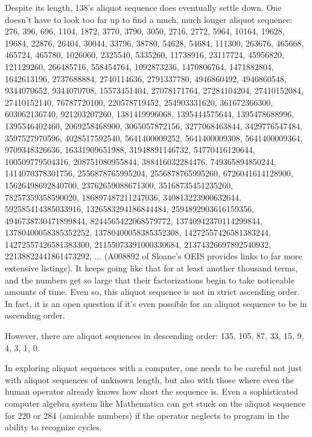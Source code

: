 \documentclass[12pt]{article}
\begin{document}
Despite its length, 138's aliquot sequence does eventually settle down. One doesn't have to look too far up to find a much, much longer aliquot sequence: 276, 396, 696, 1104, 1872, 3770, 3790, 3050, 2716, 2772, 5964, 10164, 19628, 19684, 22876, 26404, 30044, 33796, 38780, 54628, 54684, 111300, 263676, 465668, 465724, 465780, 1026060, 2325540, 5335260, 11738916, 23117724, 45956820, 121129260, 266485716, 558454764, 1092873236, 1470806764, 1471882804, 1642613196, 2737688884, 2740114636, 2791337780, 4946860492, 4946860548, 9344070652, 9344070708, 15573451404, 27078171764, 27284104204, 27410152084, 27410152140, 76787720100, 220578719452, 254903331620, 361672366300, 603062136740, 921203207260, 1381419996068, 1395444575644, 1395478688996, 1395546402460, 2069258468900, 3065057872156, 3277068463844, 
3429776547484, 3597527970596, 4028517592540, 5641400009252, 5641400009308, 5641400009364, 9709348326636, 16331909651988, 31948891146732, 54770416120644, 100509779504316, 208751080955844, 388416032284476, 749365894850244, 1414070378301756, 2556878765995204, 2556878765995260, 6726041614128900, 15626498692840700, 23762659088671300, 35168735451235260, 78257359358590020, 186897487211247036, 340813223900632644, 592585414385033916, 1326583294186844484, 2594892903616159356, 4946738730471899844, 8244565422068579772, 13740942370114299844, 13780400058385352252, 13780400058385352308, 14272557426581383244, 14272557426581383300, 21155073391000330684, 21374326697892540932, 22138822441861473292, ... (A008892 of Sloane's OEIS provides links to far more extensive listings). It keeps going like that for at least another thousand terms, and the numbers get so large that their factorizations begin to take noticeable amounts of time. Even so, this aliquot sequence is not in strict ascending order. In fact, it is an open question if it's even possible for an aliquot sequence to be in ascending order.

However, there are aliquot sequences in descending order: 135, 105, 87, 33, 15, 9, 4, 3, 1, 0.

In exploring aliquot sequences with a computer, one needs to be careful not just with aliquot sequences of unknown length, but also with those where even the human operator already knows how short the sequence is. Even a sophisticated computer algebra system like Mathematica can get stuck on the aliquot sequence for 220 or 284 (amicable numbers) if the operator neglects to program in the ability to recognize cycles.
\end{document}
